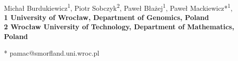 \documentclass[10pt,letterpaper]{article}
\date{}
\begin{document}
\vspace*{0.35in}

\begin{flushleft}
{\Large
\textbf{}
}
\newline
\\
Micha\l{}  Burdukiewicz\textsuperscript{1},
Piotr Sobczyk\textsuperscript{2},
Pawe\l{} B\l{}a\.{z}ej\textsuperscript{1},
Pawe\l{} Mackiewicz*\textsuperscript{1},
\\
\bigskip
\bf{1} University of Wroc\l{}aw, Department of Genomics, Poland
\\
\bf{2} Wroc\l{}aw University of Technology, Department of Mathematics, Poland
\\
\bigskip

* pamac@smorfland.uni.wroc.pl

\end{flushleft}
\end{document}

